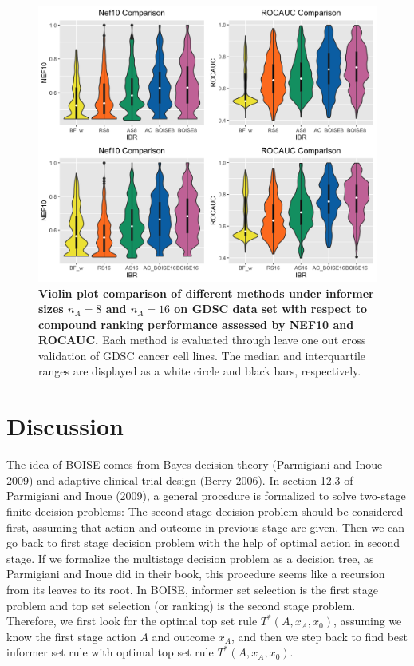 \documentclass[12pt]{article}
\begin{document}
\begin{figure}[!ht]
\centering
\includegraphics[width=5.0in]{GDSC.png}
\caption{\label{fig:gdsc} 
{\bf Violin plot comparison of different methods under informer sizes $n_A =8$ and $n_A = 16$ on GDSC data set with respect to compound ranking performance assessed by NEF10 and ROCAUC.} Each method is evaluated through leave one out cross validation of GDSC cancer cell lines. The median and interquartile ranges are displayed as a white circle and black bars, respectively.}
\end{figure}



\section{Discussion}

The idea of BOISE comes from Bayes decision theory (Parmigiani and Inoue 2009) and adaptive clinical trial design (Berry 2006). In section 12.3 of Parmigiani and Inoue (2009), a general procedure is formalized to solve two-stage finite decision problems: The second stage decision problem should be considered first, assuming that action and outcome in previous stage are given. Then we can go back to first stage decision problem with the help of optimal action in second stage. If we formalize the multistage decision problem as a decision tree, as Parmigiani and Inoue did in their book, this procedure seems like a recursion from its leaves to its root. In BOISE, informer set selection is the first stage problem and top set selection (or ranking) is the second stage problem. Therefore, we first look for the optimal top set rule $T^*(A,x_A,x_0)$, assuming we know the first stage action $A$ and outcome $x_A$, and then we step back to find best informer set rule with optimal top set rule $T^*(A,x_A,x_0)$. 
\end{document}
